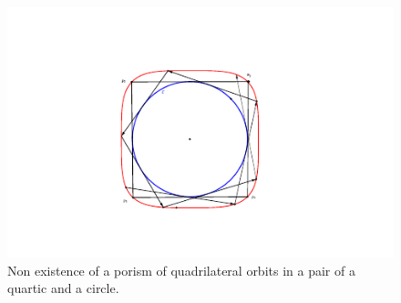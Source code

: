 \begin{exercise}
\begin{figure}
    \centering
     \includegraphics[scale=1]{pics_tex/periodo4_darboux_Q4_C2.pdf}
    \caption{Non existence of a porism of quadrilateral orbits in a pair of a quartic and a circle.}
    \label{fig:period4darboux}
\end{figure}

\end{exercise}


\begin{exercise}\label{ex:23}

\end{exercise}


\begin{exercise}\label{ex:24}

\end{exercise}
